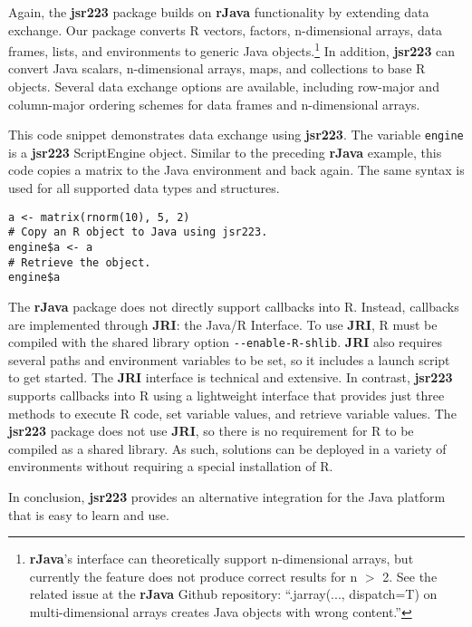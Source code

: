 Again, the \textbf{jsr223} package builds on \textbf{rJava} functionality by extending data exchange. Our package converts R vectors, factors, n-dimensional arrays, data frames, lists, and environments to generic Java objects.\footnote{\textbf{rJava}'s interface can theoretically support n-dimensional arrays, but currently the feature does not produce correct results for n $>$ 2. See the related issue at the \textbf{rJava} Github repository: ``.jarray(..., dispatch=T) on multi-dimensional arrays creates Java objects with wrong content.''} In addition, \textbf{jsr223} can convert Java scalars, n-dimensional arrays, maps, and collections to base R objects. Several data exchange options are available, including row-major and column-major ordering schemes for data frames and n-dimensional arrays.

This code snippet demonstrates data exchange using \textbf{jsr223}. The variable \texttt{engine} is a \textbf{jsr223} ScriptEngine object. Similar to the preceding \textbf{rJava} example, this code copies a matrix to the Java environment and back again. The same syntax is used for all supported data types and structures.

\singlespace
\begin{verbatim}
a <- matrix(rnorm(10), 5, 2)
# Copy an R object to Java using jsr223.
engine$a <- a
# Retrieve the object.
engine$a
\end{verbatim}
\doublespace

The \textbf{rJava} package does not directly support callbacks into R. Instead, callbacks are implemented through \textbf{JRI}: the Java/R Interface. To use \textbf{JRI}, R must be compiled with the shared library option \texttt{-{}-enable-R-shlib}. \textbf{JRI} also requires several paths and environment variables to be set, so it includes a launch script to get started. The \textbf{JRI} interface is technical and extensive. In contrast, \textbf{jsr223} supports callbacks into R using a lightweight interface that provides just three methods to execute R code, set variable values, and retrieve variable values. The \textbf{jsr223} package does not use \textbf{JRI}, so there is no requirement for R to be compiled as a shared library. As such, solutions can be deployed in a variety of environments without requiring a special installation of R.

In conclusion, \textbf{jsr223} provides an alternative integration for the Java platform that is easy to learn and use.
